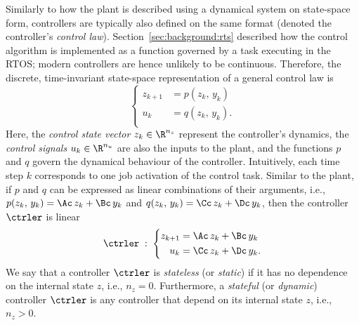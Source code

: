 Similarly to how the plant is described using a dynamical system on state-space form, controllers are typically also defined on the same format (denoted the controller's \emph{control law}).
Section~\ref{sec:background:rts} described how the control algorithm is implemented as a function governed by a task executing in the RTOS; modern controllers are hence unlikely to be continuous.
Therefore, the discrete, time-invariant state-space representation of a general control law is
%
\begin{equation}%
    \label{eq:discrete-state-space}%
    \left\{\begin{aligned}
        z_{k+1} &= p(z_k,\, y_k) \\
        u_k &= q(z_k,\, y_k). \\
    \end{aligned}\right.
\end{equation}
%
Here, the \emph{control state vector} $z_k \in \R^{n_z}$ represent the controller's dynamics, the \emph{control signals} $u_k \in \R^{n_u}$ are also the inputs to the plant, and the functions $p$ and $q$ govern the dynamical behaviour of the controller.
Intuitively, each time step $k$ corresponds to one job activation of the control task.
Similar to the plant, if $p$ and $q$ can be expressed as linear combinations of their arguments, i.e., $p(z_k,\, y_k) = \Ac\,z_k+\Bc\,y_k$ and $q(z_k,\, y_k) = \Cc\,z_k+\Dc\,y_k$, then the controller $\ctrler$ is linear
%
\begin{equation}%
    \label{eq:discrete-lti-ctrler}%
    \ctrler \; : \; \left\{\begin{aligned}
        z_{k+1} &= \Ac\,z_k + \Bc\,y_k \\
        u_k &= \Cc\,z_k + \Dc\,y_k. \\
    \end{aligned}\right.
\end{equation}
%
We say that a controller $\ctrler$ is \emph{stateless} (or \emph{static}) if it has no dependence on the internal state $z$, i.e., $n_z = 0$.
Furthermore, a \emph{stateful} (or \emph{dynamic}) controller $\ctrler$ is any controller that depend on its internal state $z$, i.e., $n_z > 0$.

